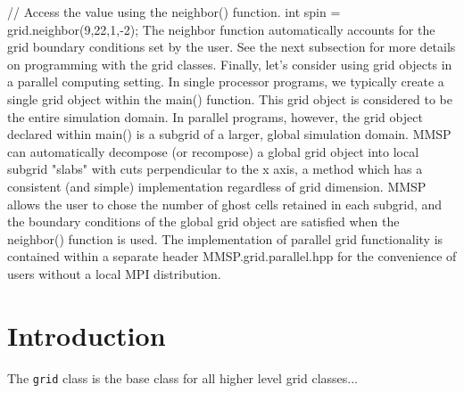     // Access the value using the neighbor() function.
    int spin = grid.neighbor(9,22,1,-2);
The neighbor function automatically accounts for the grid boundary conditions set by the user. See the next subsection for more details on programming with the grid classes. 
Finally, let's consider using grid objects in a parallel computing setting. In single processor programs, we typically create a single grid object within the main() function. This grid object is considered to be the entire simulation domain. In parallel programs, however, the grid object declared within main() is a subgrid of a larger, global simulation domain. MMSP can automatically decompose (or recompose) a global grid object into local subgrid "slabs" with cuts perpendicular to the x axis, a method which has a consistent (and simple) implementation regardless of grid dimension. MMSP allows the user to chose the number of ghost cells retained in each subgrid, and the boundary conditions of the global grid object are satisfied when the neighbor() function is used. The implementation of parallel grid functionality is contained within a separate header MMSP.grid.parallel.hpp for the convenience of users without a local MPI distribution. 

\section{Introduction}
The {\tt grid} class is the base class for all higher level grid classes...

